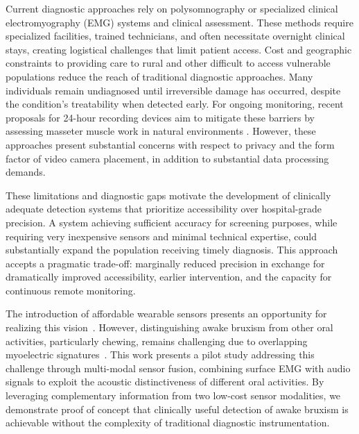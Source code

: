 \documentclass[pdflatex,sn-vancouver-num, iicol]{sn-jnl}
\begin{document}
Current diagnostic approaches rely on polysomnography or specialized clinical electromyography (EMG) systems and clinical assessment. These methods require specialized facilities, trained technicians, and often necessitate overnight clinical stays, creating logistical challenges that limit patient access.  Cost and geographic constraints to providing care to rural and other difficult to access vulnerable populations reduce the reach of traditional diagnostic approaches. Many individuals remain undiagnosed until irreversible damage has occurred, despite the condition's treatability when detected early. For ongoing monitoring, recent proposals for 24-hour recording devices aim to mitigate these barriers by assessing masseter muscle work in natural environments \cite{colonna2023electromyographic}. However, these approaches present substantial concerns with respect to privacy and the form factor of video camera placement, in addition to substantial data processing demands.

These limitations and diagnostic gaps motivate the development of clinically adequate detection systems that prioritize accessibility over hospital-grade precision. A system achieving sufficient accuracy for screening purposes, while requiring very inexpensive sensors and minimal technical expertise, could substantially expand the population receiving timely diagnosis. This approach accepts a pragmatic trade-off: marginally reduced precision in exchange for dramatically improved accessibility, earlier intervention, and the capacity for continuous remote monitoring.

The introduction of affordable wearable sensors presents an opportunity for realizing this vision~\cite{gul2024advanced}. However, distinguishing awake bruxism from other oral activities, particularly chewing, remains challenging due to overlapping myoelectric signatures~\cite{stuginski2016detection}. This work presents a pilot study addressing this challenge through multi-modal sensor fusion, combining surface EMG with audio signals to exploit the acoustic distinctiveness of different oral activities. By leveraging complementary information from two low-cost sensor modalities, we demonstrate proof of concept that clinically useful detection of awake bruxism is achievable without the complexity of traditional diagnostic instrumentation.
\end{document}
